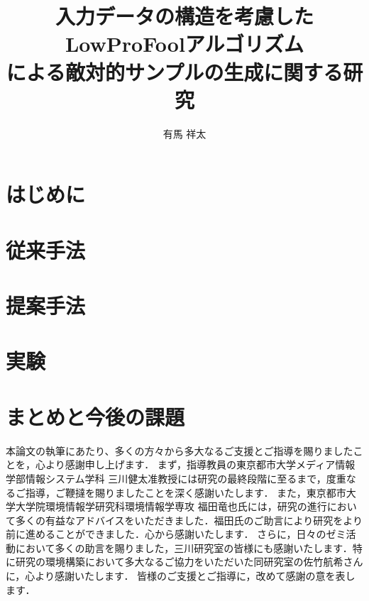 \documentclass[12pt,uplatex]{jsarticle}   %
\title{入力データの構造を考慮したLowProFoolアルゴリズム\\による敵対的サンプルの生成に関する研究}
\author{有馬 祥太}
\begin{document}
%
%
\titlepage
\jabstractpage
%
%
\tableofcontents
\newpage


\section{はじめに}


\section{従来手法}


\section{提案手法}


\section{実験}


\section{まとめと今後の課題}



\acknowledgements
本論文の執筆にあたり、多くの方々から多大なるご支援とご指導を賜りましたことを，心より感謝申し上げます．
まず，指導教員の東京都市大学メディア情報学部情報システム学科 三川健太准教授には研究の最終段階に至るまで，度重なるご指導，ご鞭撻を賜りましたことを深く感謝いたします．
また，東京都市大学大学院環境情報学研究科環境情報学専攻 福田竜也氏には，研究の進行において多くの有益なアドバイスをいただきました．福田氏のご助言により研究をより前に進めることができました．心から感謝いたします．
さらに，日々のゼミ活動において多くの助言を賜りました，三川研究室の皆様にも感謝いたします．特に研究の環境構築において多大なるご協力をいただいた同研究室の佐竹航希さんに，心より感謝いたします．
皆様のご支援とご指導に，改めて感謝の意を表します．
\end{document}

